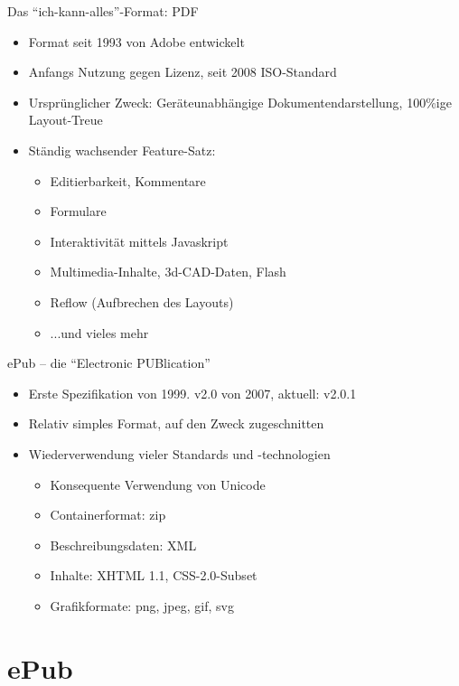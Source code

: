 \documentclass[hyperref={pdfpagelabels=false}]{beamer}
\begin{document}
\begin{frame}{Das "`ich-kann-alles"'-Format: PDF}
	\begin{itemize}
		\item Format seit 1993 von Adobe entwickelt
		\item Anfangs Nutzung gegen Lizenz, seit 2008 ISO-Standard
		\item Ursprünglicher Zweck: Geräteunabhängige Dokumentendarstellung, 100\%ige Layout-Treue
		\item Ständig wachsender Feature-Satz:
		\begin{itemize}
			\item Editierbarkeit, Kommentare
			\item Formulare
			\item Interaktivität mittels Javaskript
			\item Multimedia-Inhalte, 3d-CAD-Daten, Flash
			\item Reflow (Aufbrechen des Layouts)
			\item ...und vieles mehr
		\end{itemize}
	\end{itemize}
\end{frame}

\begin{frame}{ePub -- die "`Electronic PUBlication"'}
	\begin{itemize}
		\item Erste Spezifikation von 1999. v2.0 von 2007, aktuell: v2.0.1
		\item Relativ simples Format, auf den Zweck zugeschnitten
		\item Wiederverwendung vieler Standards und -technologien
		\begin{itemize}
			\item Konsequente Verwendung von Unicode
			\item Containerformat: zip
			\item Beschreibungsdaten: XML
			\item Inhalte: XHTML 1.1, CSS-2.0-Subset
			\item Grafikformate: png, jpeg, gif, svg
		\end{itemize}
	\end{itemize}
\end{frame}


\section{ePub}
\end{document}
